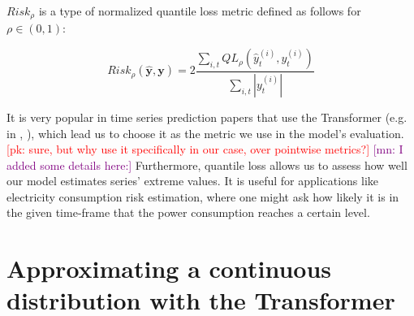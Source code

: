 \documentclass[en]{pracamgr}
\newtheorem{defi}{Definition}[section]
\newcommand{\pk}[1]{\textcolor{red}{\small [pk: #1]}}
\newcommand{\mn}[1]{\textcolor{purple}{\small [mn: #1]}}
\begin{document}
$Risk_\rho$ is a type of normalized quantile loss metric defined as follows for $\rho \in (0,1)$:

$$ Risk_\rho(\hat{\textbf{y}}, \textbf{y}) 
= 2\frac{\sum_{i,t}QL_\rho(\hat{y}^{(i)}_t, y^{(i)}_t)}
{\sum_{i,t} |y^{(i)}_t|}$$


It is very popular in time series prediction papers that use the Transformer (e.g. in \cite{enhancing}, \cite{deepar}), which lead us to choose it as the metric we use in the model's evaluation. \pk{sure, but why use it specifically in our case, over pointwise metrics?} \mn{I added some details here:} Furthermore, quantile loss allows us to assess how well our model estimates series' extreme values. It is useful for applications like electricity consumption risk estimation, where one might ask how likely it is in the given time-frame that the power consumption reaches a certain level. 


%




\chapter{Approximating a continuous distribution with the Transformer}



\end{document}
